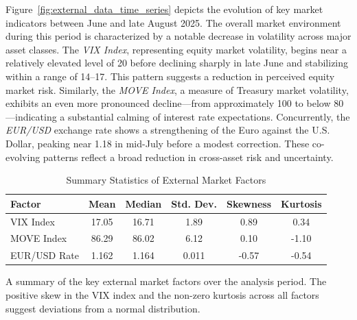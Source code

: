 Figure~\ref{fig:external_data_time_series} depicts the evolution of key market indicators between June and late August 2025. The overall market environment during this period is characterized by a notable decrease in volatility across major asset classes. The \textit{VIX Index}, representing equity market volatility, begins near a relatively elevated level of 20 before declining sharply in late June and stabilizing within a range of 14–17. This pattern suggests a reduction in perceived equity market risk. Similarly, the \textit{MOVE Index}, a measure of Treasury market volatility, exhibits an even more pronounced decline—from approximately 100 to below 80—indicating a substantial calming of interest rate expectations. Concurrently, the \textit{EUR/USD} exchange rate shows a strengthening of the Euro against the U.S. Dollar, peaking near 1.18 in mid-July before a modest correction. These co-evolving patterns reflect a broad reduction in cross-asset risk and uncertainty.

\begin{table}[H]
	\centering
	\begin{threeparttable}
		\caption{Summary Statistics of External Market Factors}
		\label{tab:external_summary}
		\begin{tabular}{lccccc}
			\toprule
			\textbf{Factor} & \textbf{Mean} & \textbf{Median} & \textbf{Std. Dev.} & \textbf{Skewness} & \textbf{Kurtosis} \\
			\midrule
			VIX Index       & 17.05         & 16.71           & 1.89               & 0.89              & 0.34              \\
			MOVE Index      & 86.29         & 86.02           & 6.12               & 0.10              & -1.10             \\
			EUR/USD Rate    & 1.162         & 1.164           & 0.011              & -0.57             & -0.54             \\
			\bottomrule
		\end{tabular}
		\begin{tablenotes}
			\footnotesize
			\item  A summary of the key external market factors over the analysis period. The positive skew in the VIX index and the non-zero kurtosis across all factors suggest deviations from a normal distribution.
		\end{tablenotes}
	\end{threeparttable}
\end{table}


